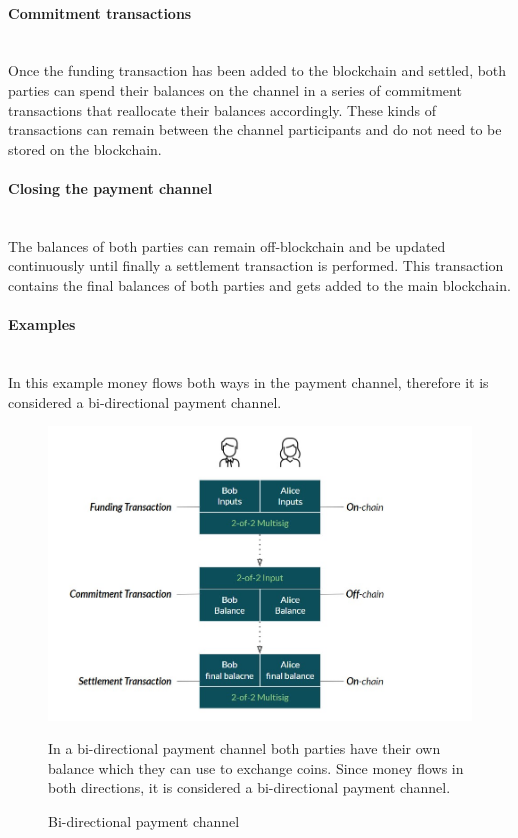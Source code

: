 \documentclass[a4paper, 12pt]{report}
\begin{document}
\paragraph{Commitment transactions} \hspace{0pt} \\
Once the funding transaction has been added to the blockchain and settled, both parties can spend their balances on the channel in a series of commitment transactions that reallocate their balances accordingly. These kinds of transactions can remain between the channel participants and do not need to be stored on the blockchain.

\paragraph{Closing the payment channel} \hspace{0pt} \\
The balances of both parties can remain off-blockchain and be updated continuously until finally a settlement transaction is performed. This transaction contains the final balances of both parties and gets added to the main blockchain.

\paragraph{Examples} \hspace{0pt} \\
In this example money flows both ways in the payment channel, therefore it is considered a bi-directional payment channel.\cite{andreas}

\begin{figure}[H]
	\centering
	\includegraphics[width=13cm]{06_Bidirectional_Channel}
	\caption{Bi-directional payment channel}
	\medskip
	\small In a bi-directional payment channel both parties have their own balance which they can use to exchange coins. Since money flows in both directions, it is considered a bi-directional payment channel.
	\label{fig:06_Bidirectional_Channel}
\end{figure}
\end{document}
